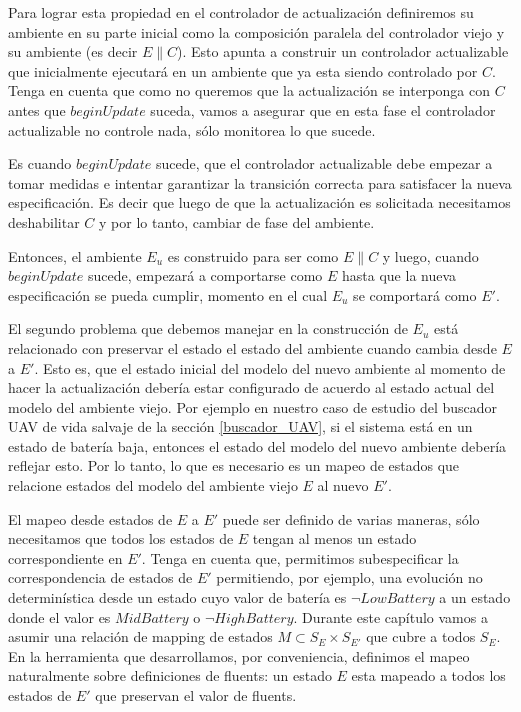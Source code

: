 Para lograr esta propiedad en el controlador de actualización definiremos su ambiente en su parte inicial como la
composición paralela del controlador viejo y su ambiente (es decir $E\|C$). Esto apunta a construir un controlador
actualizable que inicialmente ejecutará en un ambiente que ya esta siendo controlado por $C$. Tenga en cuenta que como
no queremos que la actualización se interponga con $C$ antes que $beginUpdate$ suceda, vamos a asegurar que en esta fase
el controlador actualizable no controle nada, sólo monitorea lo que sucede.

Es cuando $beginUpdate$ sucede, que el controlador actualizable debe empezar a tomar medidas e intentar garantizar
la transición correcta para satisfacer la nueva especificación. Es decir que luego de que la actualización es
solicitada necesitamos deshabilitar $C$ y por lo tanto, cambiar de fase del ambiente.

Entonces, el ambiente $E_u$ es construido para ser como $E\|C$ y luego, cuando $beginUpdate$ sucede, empezará a
comportarse como $E$ hasta que la nueva especificación se pueda cumplir, momento en el cual $E_u$ se comportará como
$E'$.

El segundo problema que debemos manejar en la construcción de $E_u$ está relacionado con preservar el estado el estado
del ambiente cuando cambia desde $E$ a $E'$. Esto es, que el estado inicial del modelo del nuevo ambiente al
momento de hacer la actualización debería estar configurado de acuerdo al estado actual del modelo del ambiente viejo.
Por ejemplo en nuestro caso de estudio del buscador UAV de vida salvaje de la sección \ref{buscador_UAV}, si el sistema
está en un estado de batería baja, entonces el estado del modelo del nuevo ambiente debería reflejar esto. Por lo tanto,
lo que es necesario es un mapeo de estados que relacione estados del modelo del ambiente viejo $E$ al nuevo $E'$.

El mapeo desde estados de $E$ a $E'$ puede ser definido de varias maneras, sólo necesitamos que todos los estados de $E$
tengan al menos un estado correspondiente en $E'$. Tenga en cuenta que, permitimos subespecificar la correspondencia de
estados de $E'$ permitiendo, por ejemplo, una evolución no determinística desde un estado cuyo valor de batería es
$\lnot LowBattery$ a un estado donde el valor es $MidBattery$ o $\neg HighBattery$. Durante este capítulo vamos a asumir
una relación de mapping de estados $M \subset S_E \times S_{E'}$ que cubre a todos $S_E$. En la herramienta que
desarrollamos, por conveniencia, definimos el mapeo naturalmente sobre definiciones de fluents: un estado $E$ esta
mapeado a todos los estados de $E'$ que preservan el valor de fluents.

